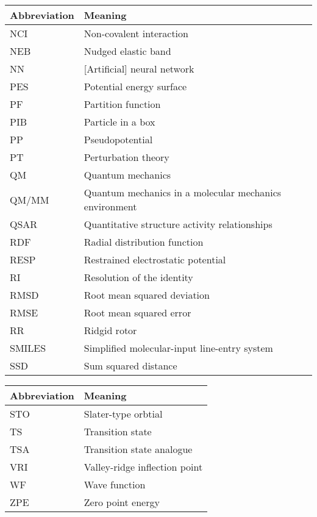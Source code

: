 \documentclass[main.tex]{subfiles}
\begin{document}
\begin{table}[h!]
\def\arraystretch{2.0}
\begin{tabularx}{\textwidth}{YY}
Abbreviation & Meaning \\
\hline
NCI	&	Non-covalent interaction	\\
NEB	&	Nudged elastic band	\\
NN	&	[Artificial] neural network	\\
PES	&	Potential energy surface	\\
PF	&	Partition function	\\
PIB	&	Particle in a box	\\
PP	&	Pseudopotential	\\
PT	&	Perturbation theory	\\
QM	&	Quantum mechanics	\\
QM/MM	&	Quantum mechanics in a molecular mechanics environment	\\
QSAR	&	Quantitative structure activity relationships	\\
RDF	&	Radial distribution function	\\
RESP	&	Restrained electrostatic potential	\\
RI	&	Resolution of the identity	\\
RMSD	&	Root mean squared deviation	\\
RMSE	&	Root mean squared error	\\
RR	&	Ridgid rotor	\\
SMILES	&	Simplified molecular-input line-entry system	\\
SSD	&	Sum squared distance	\\
\end{tabularx}
\end{table}
\newpage
\begin{table}[h!]
\def\arraystretch{2.0}
\begin{tabularx}{\textwidth}{YY}
Abbreviation & Meaning \\
\hline
STO	&	Slater-type orbtial	\\
TS	&	Transition state	\\
TSA	&	Transition state analogue	\\
VRI	&	Valley-ridge inflection point	\\
WF	&	Wave function	\\
ZPE	&	Zero point energy	\\
\end{tabularx}
\end{table}
\clearpage
\end{document}
